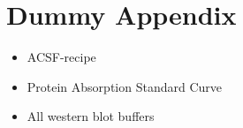 \chapter{Dummy Appendix}

\begin{itemize}
    \item ACSF-recipe
    \item Protein Absorption Standard Curve
    \item All western blot buffers
\end{itemize}

